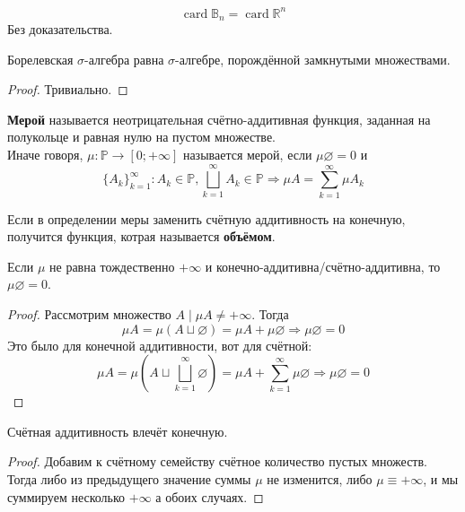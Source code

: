 \documentclass{article}
\begin{document}
    \begin{claim}
        $$\operatorname{card}\mathbb B_n=\operatorname{card}\mathbb R^n$$
        Без доказательства.
    \end{claim}
    \begin{claim}
        Борелевская $\sigma$-алгебра равна $\sigma$-алгебре, порождённой замкнутыми множествами.
    \end{claim}
    \begin{proof}
        Тривиально.
    \end{proof}
    \begin{definition}
        \textbf{Мерой} называется неотрицательная счётно-аддитивная функция, заданная на полукольце и равная нулю на пустом множестве.\\
        Иначе говоря, $\mu\colon\mathbb P\to[0;+\infty]$ называется мерой, если $\mu\varnothing=0$ и
        $$
        \{A_k\}_{k=1}^\infty:A_k\in\mathbb P,\bigsqcup\limits_{k=1}^\infty A_k\in\mathbb P\Rightarrow\mu A=\sum\limits_{k=1}^\infty\mu A_k
        $$
    \end{definition}
    \begin{definition}
        Если в определении меры заменить счётную аддитивность на конечную, получится функция, котрая называется \textbf{объёмом}.
    \end{definition}
    \begin{claim}
        Если $\mu$ не равна тождественно $+\infty$ и конечно-аддитивна/счётно-аддитивна, то $\mu\varnothing=0$.
    \end{claim}
    \begin{proof}
        Рассмотрим множество $A\mid\mu A\neq+\infty$. Тогда
        $$
        \mu A=\mu(A\sqcup\varnothing)=\mu A+\mu\varnothing\Rightarrow\mu\varnothing=0
        $$
        Это было для конечной аддитивности, вот для счётной:
        $$
        \mu A=\mu\left(A\sqcup\bigsqcup\limits_{k=1}^\infty\varnothing\right)=\mu A+\sum\limits_{k=1}^\infty\mu\varnothing\Rightarrow\mu\varnothing=0
        $$
    \end{proof}
    \begin{claim}
        Счётная аддитивность влечёт конечную.
    \end{claim}
    \begin{proof}
        Добавим к счётному семейству счётное количество пустых множеств. Тогда либо из предыдущего значение суммы $\mu$ не изменится, либо $\mu\equiv+\infty$, и мы суммируем несколько $+\infty$ а обоих случаях.
    \end{proof}
\end{document}
